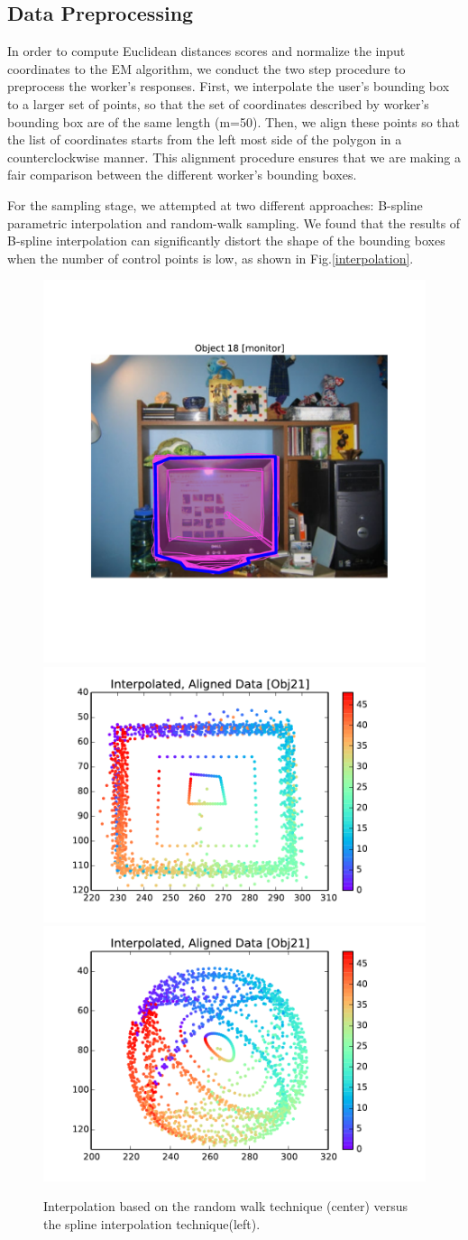 \documentclass[12pt]{article}
\begin{document}
\begin{appendices}
\section{Data Preprocessing}
\par In order to compute Euclidean distances scores and normalize the input coordinates to the EM algorithm, we conduct the two step procedure to preprocess the worker's responses. First, we interpolate the user's bounding box to a larger set of points, so that the set of coordinates described by worker's bounding box are of the same length  (m=50). Then, we align these points so that the list of coordinates starts from the left most side of the polygon in a counterclockwise manner. This alignment procedure ensures that we are making a fair comparison between the different worker's bounding boxes. 
\par For the sampling stage, we attempted at two different approaches: B-spline parametric interpolation and random-walk sampling. We found that the results of B-spline interpolation can significantly distort the shape of the bounding boxes when the number of control points is low, as shown in Fig.\ref{interpolation}.
\begin{figure}[ht!]
\includegraphics[width=0.3\linewidth]{plots/bb_object_18.pdf}
\includegraphics[width=0.3\linewidth]{plots/random_interpolated_aligned.pdf}
\includegraphics[width=0.3\linewidth]{plots/bspline_interpolated_aligned.pdf}
\caption{Interpolation based on the random walk technique (center) versus the spline interpolation technique(left).}

\end{figure}
\end{appendices}
\end{document}
